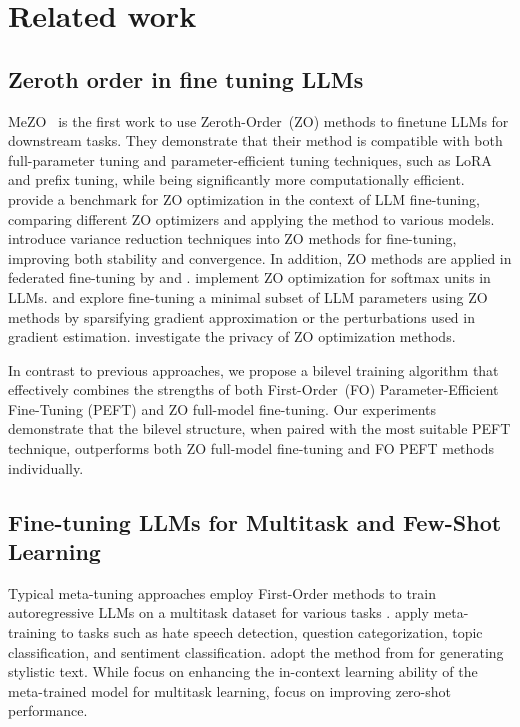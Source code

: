 \section{Related work}
\subsection{Zeroth order in fine tuning LLMs}
MeZO~\citep{MalladiGNDL0A23Mezo} is the first work to use Zeroth-Order~(ZO) methods to finetune LLMs for downstream tasks. They demonstrate that their method is compatible with both full-parameter tuning and parameter-efficient tuning techniques, such as LoRA and prefix tuning, while being significantly more computationally efficient. \citet{ZhangLHLZZCLY0W24Zobench} provide a benchmark for ZO optimization in the context of LLM fine-tuning, comparing different ZO optimizers and applying the method to various models. \citet{GautamPZRH24} introduce variance reduction techniques into ZO methods for fine-tuning, improving both stability and convergence. In addition, ZO methods are applied in federated fine-tuning by \citet{QinCQDLD24} and \citet{LingCYL024}. \citet{DengLMS24} implement ZO optimization for softmax units in LLMs. \citet{GuoLZLY24} and \citet{LiuZGCHY24} explore fine-tuning a minimal subset of LLM parameters using ZO methods by sparsifying gradient approximation or the perturbations used in gradient estimation. \citet{TaPNMM24} investigate the privacy of ZO optimization methods. {\color{blue}}

In contrast to previous approaches, we propose a bilevel training algorithm that effectively combines the strengths of both First-Order~(FO) Parameter-Efficient Fine-Tuning (PEFT) and ZO full-model fine-tuning. Our experiments demonstrate that the bilevel structure, when paired with the most suitable PEFT technique, outperforms both ZO full-model fine-tuning and FO PEFT methods individually.

\subsection{Fine-tuning LLMs for Multitask and Few-Shot Learning}
Typical meta-tuning approaches employ First-Order methods to train autoregressive LLMs on a multitask dataset for various tasks \citep{ZhongLZK21, MinLZH22MetaICL, GuoXR24}. \citet{ZhongLZK21} apply meta-training to tasks such as hate speech detection, question categorization, topic classification, and sentiment classification. \citet{GuoXR24} adopt the method from \citet{MinLZH22MetaICL} for generating stylistic text. While \citet{MinLZH22MetaICL} focus on enhancing the in-context learning ability of the meta-trained model for multitask learning, \citet{ZhongLZK21} focus on improving zero-shot performance.

